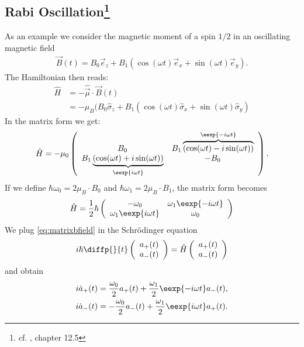 \subsection[Rabi Oscillation]{Rabi Oscillation\footnote{cf. \cite{basdevant}, chapter 12.5}}
As an example we consider the magnetic moment of a spin $1/2$ in an oscillating magnetic field
\begin{align}
\vec{B}(t) = B_0 \vec{e}_z + B_1 (\cos(\omega t) \vec{e}_x+ \sin(\omega t) \vec{e}_y).
\end{align}
The Hamiltonian then reads:
\begin{align}
\hat{H} &= - \hat{\vec{\mu}}\cdot\vec{B}(t)\\ 
		&= -\mu_B (B_0 \hat{\sigma}_z + B_1(\cos(\omega t) \hat{\sigma}_x + \sin(\omega t) \hat{\sigma}_y)
\end{align}
In the matrix form we get:
\begin{align}
\hat{H} = -\mu_0 \left( \begin{array}{cc} B_0 & B_1 \overbrace{(\cos(\omega t) - i \sin(\omega t))}^{\eexp{-i\omega t}} \\ B_1 \underbrace{(\cos(\omega t) + i \sin(\omega t))}_{\eexp{i\omega t}} & -B_0 \end{array} \right).
\end{align}
If we define $\hbar \omega_0 = 2 \mu_B \cdot B_0$ and $\hbar\omega_1 = 2 \mu_B \cdot B_1$, the matrix form becomes
\begin{align} \label{eq:matrixbfield}
\hat{H} = \frac{1}{2}\hbar \left( \begin{array}{cc} -\omega_0 & \omega_1 \eexp{-i\omega t}\\ \omega_1 \eexp{i\omega t } & \omega_0 \end{array} \right)
\end{align}
We plug \eqref{eq:matrixbfield} in the Schrödinger equation
\begin{align}
i\hbar \diffp{}{t} \left(\begin{array}{cc}a_+(t)\\ a_-(t) \end{array} \right) = \hat{H} \left(\begin{array}{c}a_+(t) \\ a_-(t) \end{array} \right)
\end{align}
and obtain
\begin{align}
i \dot{a}_+(t) = \frac{\omega_0}{2} a_+(t) + \frac{\omega_1}{2} \eexp{-i\omega t} a_-(t),\\
i \dot{a}_-(t) = -\frac{\omega_0}{2}a_-(t) + \frac{\omega_1}{2}\eexp{i\omega t}a_+(t).
\end{align}

